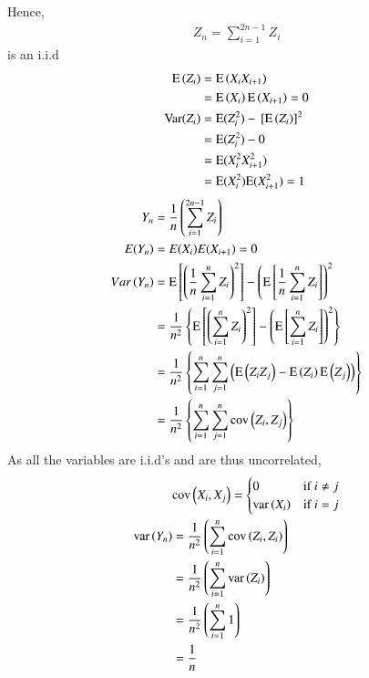 \documentclass[journal,12pt,Twocolumn]{IEEEtran}
\theoremstyle{remark}
\begin{document}
Hence,
\begin{align} Z_n=\sum_{i=1}^{2n-1}Z_i 
\end{align} is an i.i.d 
\begin{align}
\text{E}\left(Z_i\right)&=\text{E}\left(X_iX_{i+1}\right) \\
&=\text{E}\left(X_i\right)\text{E}\left(X_{i+1}\right) = 0 \\
\text{Var}(Z_i)&=\text{E}(Z_i^2)-{}\left[\text{E}\left(Z_i\right)\right]^2 \\
&=\text{E}(Z_i^2)-0 \\ 
&=\text{E}(X_i^2X_{i+1}^2) \\
&=\text{E}(X_{i}^2)\text{E}(X_{i+1}^2) = 1  
\end{align}
\begin{align}
Y_n&=\frac{1}{n}\left(\sum_{i=1}^{2n-1} Z_i\right) \\
E(Y_n)&=E(X_i)E(X_{i+1})=0 \\ 
Var\left(Y_n\right) &= \text{E}{}\left[\left(\frac{1}{n} \sum_{i=1}^{n} Z_i\right)^2\right]-\left(\text{E}{}\left[\frac{1}{n} \sum_{i=1}^{n} Z_i\right]\right)^2 \\
&=\frac{1}{n^2} \left\{\text{E}{}\left[\left(\sum_{i=1}^{n} Z_i\right)^2\right]-\left(\text{E}{}\left[\sum_{i=1}^{n} Z_i\right]\right)^2\right\} \\
&=\frac{1}{n^2}\left\{\sum_{i=1}^{n}\sum_{j=1}^{n}\left(\text{E}\left(Z_iZ_j\right)-\text{E}\left(Z_i\right)\text{E}\left(Z_j\right)\right)\right\} \\
&=\frac{1}{n^2}\left\{\sum_{i=1}^{n}\sum_{j=1}^{n}\text{cov}\left(Z_i, Z_j\right)\right\} 
\end{align}
As all the variables are i.i.d's and are thus uncorrelated,
\begin{align}
&\text{cov}\left(X_i, X_j\right) =
\begin{cases}
	0 & \text{if } i \ne j\\
    \text{var}\left(X_i\right) & \text{if } i = j
\end{cases} \\
\text{var}\left(Y_n\right)&=\frac{1}{n^2}\left(\sum_{i=1}^{n}\text{cov}\left(Z_i, Z_i\right)\right)\\
&= \frac{1}{n^2} \left(\sum_{i=1}^{n} \text{var}\left(Z_i\right)\right)\\
&= \frac{1}{n^2} \left(\sum_{i=1}^{n} 1\right)\\
&= \frac{1}{n}
\end{align}
\end{document}
